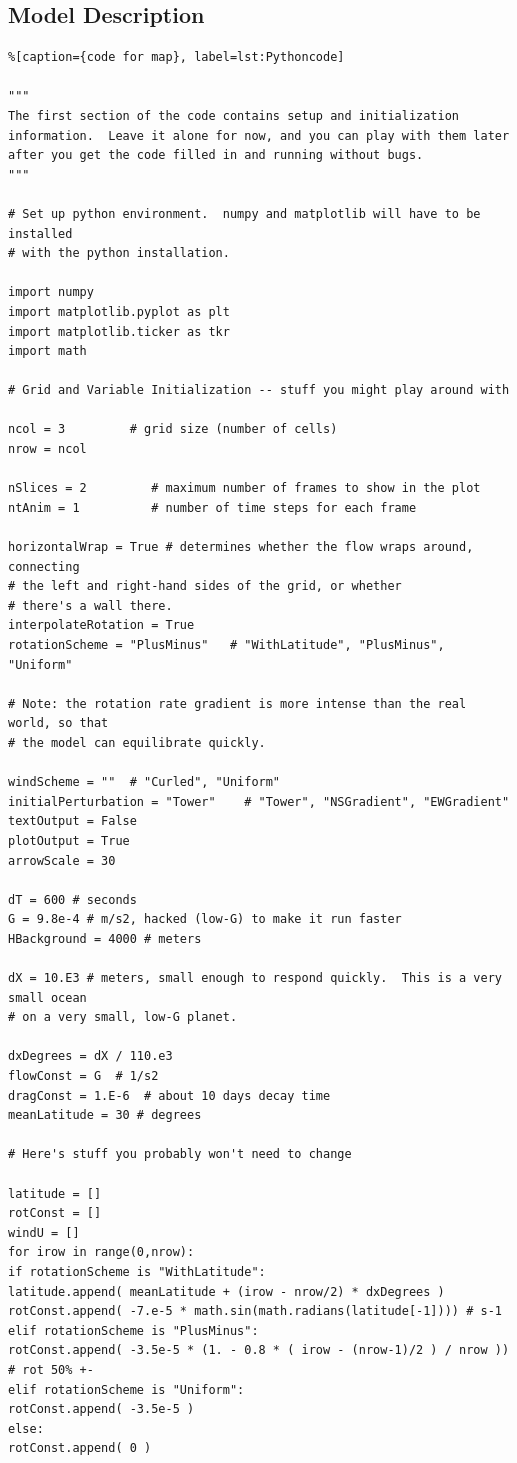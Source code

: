 {\subsection{Model Description}

\begin{lstlisting}%[caption={code for map}, label=lst:Pythoncode]

"""
The first section of the code contains setup and initialization 
information.  Leave it alone for now, and you can play with them later 
after you get the code filled in and running without bugs.  
"""

# Set up python environment.  numpy and matplotlib will have to be installed
# with the python installation.

import numpy
import matplotlib.pyplot as plt
import matplotlib.ticker as tkr
import math

# Grid and Variable Initialization -- stuff you might play around with

ncol = 3         # grid size (number of cells)
nrow = ncol

nSlices = 2         # maximum number of frames to show in the plot
ntAnim = 1          # number of time steps for each frame

horizontalWrap = True # determines whether the flow wraps around, connecting
# the left and right-hand sides of the grid, or whether
# there's a wall there. 
interpolateRotation = True
rotationScheme = "PlusMinus"   # "WithLatitude", "PlusMinus", "Uniform"

# Note: the rotation rate gradient is more intense than the real world, so that
# the model can equilibrate quickly.

windScheme = ""  # "Curled", "Uniform"
initialPerturbation = "Tower"    # "Tower", "NSGradient", "EWGradient"
textOutput = False
plotOutput = True
arrowScale = 30

dT = 600 # seconds
G = 9.8e-4 # m/s2, hacked (low-G) to make it run faster
HBackground = 4000 # meters

dX = 10.E3 # meters, small enough to respond quickly.  This is a very small ocean
# on a very small, low-G planet.  

dxDegrees = dX / 110.e3
flowConst = G  # 1/s2
dragConst = 1.E-6  # about 10 days decay time
meanLatitude = 30 # degrees

# Here's stuff you probably won't need to change

latitude = []
rotConst = []
windU = []
for irow in range(0,nrow):
if rotationScheme is "WithLatitude":
latitude.append( meanLatitude + (irow - nrow/2) * dxDegrees )
rotConst.append( -7.e-5 * math.sin(math.radians(latitude[-1]))) # s-1
elif rotationScheme is "PlusMinus":
rotConst.append( -3.5e-5 * (1. - 0.8 * ( irow - (nrow-1)/2 ) / nrow )) # rot 50% +-
elif rotationScheme is "Uniform":
rotConst.append( -3.5e-5 ) 
else:
rotConst.append( 0 )


\end{lstlisting}}
